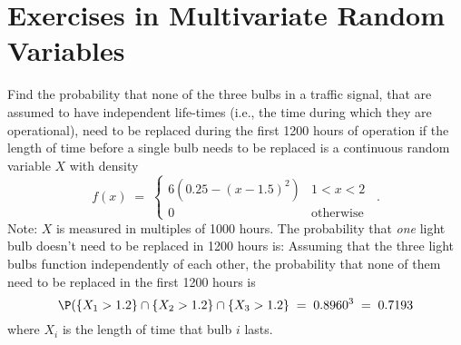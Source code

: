 \section{Exercises in Multivariate Random Variables}\label{S:xsMultivariateRVs}
\begin{ExerciseList}
\Exercise
Find the probability that none of the three bulbs in a traffic signal, that are assumed to have independent life-times (i.e., the time during which they are operational), need to be replaced during the first 1200 hours of operation if the length of time before a single bulb needs to  be replaced is a continuous random variable $X$ with density
$$f(x)\;=\;\begin{cases}6\left(0.25-(x-1.5)^2\right)&1<x<2\\0&\textrm{otherwise}\end{cases}\enspace.$$
Note: $X$ is measured in multiples of 1000 hours.
\Answer
The probability that  \emph{one}  light bulb doesn't need to be replaced in  1200 hours is:
Assuming  that   the three light bulbs function  independently of  each
other, the probability that none of them need to be replaced in the
first 1200 hours is
$$\P(\{X_1>1.2\}\cap\{X_2>1.2\}\cap\{X_3>1.2\}\;=\;0.8960^3\;=\;
0.7193$$
where $X_i$ is the length of time that bulb $i$ lasts.


\end{ExerciseList}
